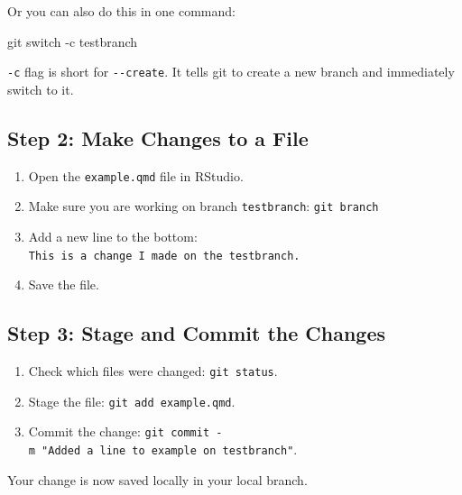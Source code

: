 \documentclass[
  11pt,
  letterpaper,
  DIV=11,
  numbers=noendperiod]{scrartcl}
\newenvironment{Shaded}{\begin{snugshade}}{\end{snugshade}}
\newcommand{\AttributeTok}[1]{\textcolor[rgb]{0.40,0.45,0.13}{#1}}
\newcommand{\FunctionTok}[1]{\textcolor[rgb]{0.28,0.35,0.67}{#1}}
\newcommand{\NormalTok}[1]{\textcolor[rgb]{0.00,0.23,0.31}{#1}}
\providecommand{\tightlist}{%
  \setlength{\itemsep}{0pt}\setlength{\parskip}{0pt}}\usepackage{longtable,booktabs,array}
\let\textttOrig\texttt
\renewcommand{\texttt}[1]{\textttOrig{\colorbox{codebggray}{\textcolor{codefontcolor}{#1}}}}
\begin{document}
Or you can also do this in one command:

\begin{Shaded}
\begin{Highlighting}[]
\FunctionTok{git}\NormalTok{ switch }\AttributeTok{{-}c}\NormalTok{ testbranch}
\end{Highlighting}
\end{Shaded}

\begin{tcolorbox}[enhanced jigsaw, rightrule=.15mm, coltitle=black, colback=white, arc=.35mm, titlerule=0mm, colbacktitle=quarto-callout-tip-color!10!white, breakable, left=2mm, toptitle=1mm, leftrule=.75mm, title=\textcolor{quarto-callout-tip-color}{\faLightbulb}\hspace{0.5em}{Tip}, opacityback=0, bottomrule=.15mm, toprule=.15mm, bottomtitle=1mm, opacitybacktitle=0.6, colframe=quarto-callout-tip-color-frame]

\texttt{-c} flag is short for \texttt{-\/-create}. It tells git to
create a new branch and immediately switch to it.

\end{tcolorbox}

\subsection{Step 2: Make Changes to a
File}\label{step-2-make-changes-to-a-file}

\begin{enumerate}
\def\labelenumi{\arabic{enumi}.}
\tightlist
\item
  Open the \texttt{example.qmd} file in RStudio.
\item
  Make sure you are working on branch \texttt{testbranch}:
  \texttt{git\ branch}
\item
  Add a new line to the bottom:
  \texttt{This\ is\ a\ change\ I\ made\ on\ the\ testbranch.}
\item
  Save the file.
\end{enumerate}

\subsection{Step 3: Stage and Commit the
Changes}\label{step-3-stage-and-commit-the-changes}

\begin{enumerate}
\def\labelenumi{\arabic{enumi}.}
\tightlist
\item
  Check which files were changed: \texttt{git\ status}.
\item
  Stage the file: \texttt{git\ add\ example.qmd}.
\item
  Commit the change:
  \texttt{git\ commit\ -m\ "Added\ a\ line\ to\ example\ on\ testbranch"}.
\end{enumerate}

Your change is now saved locally in your local branch.
\end{document}
